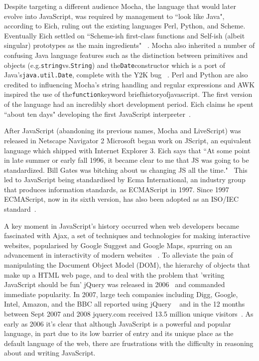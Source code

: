 \documentclass[]{final_report}
\begin{document}
Despite targeting a different audience Mocha, the language that would later evolve into JavaScript, was required by management to ``look like Java", according to Eich, ruling out the existing languages Perl, Python, and Scheme. Eventually Eich settled on ``Scheme-ish first-class functions and Self-ish (albeit singular) prototypes as the main ingredients" ~\cite{popularityofjavascript}. Mocha also inherited a number of confusing Java language features such as the distinction between primitives and objects (e.g.\lstinline{string}vs.\lstinline{String}) and the\lstinline{Date}constructor which is a port of Java's\lstinline{java.util.Date}, complete with the Y2K bug ~\cite{brendaneichtimetomakejscomment}. Perl and Python are also credited to influencing Mocha's string handling and regular expressions and AWK inspired the use of the\lstinline{function}keyword briefhistoryofjavascript. The first version of the language had an incredibly short development period. Eich claims he spent ``about ten days" developing the first JavaScript interpreter~\cite{AZProgrammingLanguages}.

After JavaScript (abandoning its previous names, Mocha and LiveScript) was released in Netscape Navigator 2 Microsoft began work on JScript, an equivalent language which shipped with Internet Explorer 3. Eich says that ``At some point in late summer or early fall 1996, it became clear to me that JS was going to be standardized. Bill Gates was bitching about us changing JS all the time."~\cite{newjavascriptmoduleowner} This led to JavaScript being standardised by Ecma International, an industry group that produces information standards, as ECMAScript in 1997. Since 1997 ECMAScript, now in its sixth version, has also been adopted as an ISO/IEC standard~\cite{ISO/IEC16262:2011}.

A key moment in JavaScript's history occurred when web developers became fascinated with Ajax, a set of techniques and technologies for making interactive websites, popularised by Google Suggest and Google Maps, spurring on an advancement in interactivity of modern websites ~\cite{ajax}. To alleviate the pain of manipulating the Document Object Model (DOM), the hierarchy of objects that make up a HTML web page, and to deal with the problem that  'writing JavaScript should be fun' jQuery was released in 2006~\cite{historyofjquery} and commanded immediate popularity. In 2007, large tech companies including Digg, Google, Intel, Amazon, and the BBC all reported using jQuery ~\cite{historyofjquery} and in the 12 months between Sept 2007 and 2008 jquery.com received 13.5 million unique visitors~\cite{stateofjquery}. As early as 2006 it's clear that although JavaScript is a powerful and popular language, in part due to its low barrier of entry and its unique place as the default language of the web, there are frustrations with the difficulty in reasoning about and writing JavaScript.
\end{document}
